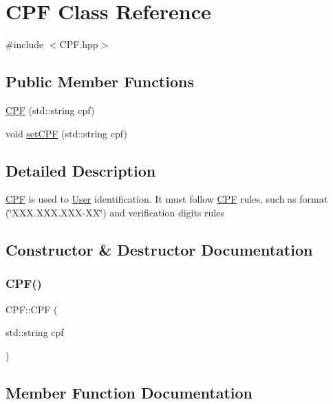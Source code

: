 \hypertarget{class_c_p_f}{}\section{C\+PF Class Reference}
\label{class_c_p_f}


{\ttfamily \#include $<$C\+P\+F.\+hpp$>$}

\subsection*{Public Member Functions}
\begin{DoxyCompactItemize}
\item 
\mbox{\hyperlink{class_c_p_f_ae6d429bd44c42bdbad7835b38bfe1639}{C\+PF}} (std\+::string cpf)
\item 
void \mbox{\hyperlink{class_c_p_f_a13881eec59b8edf78e9b99ab5cecd2e5}{set\+C\+PF}} (std\+::string cpf)
\end{DoxyCompactItemize}


\subsection{Detailed Description}
\mbox{\hyperlink{class_c_p_f}{C\+PF}} is used to \mbox{\hyperlink{class_user}{User}} identification. It must follow \mbox{\hyperlink{class_c_p_f}{C\+PF}} rules, such as format (\char`\"{}\+X\+X\+X.\+X\+X\+X.\+X\+X\+X-\/\+X\+X\char`\"{}) and verification digits rules 

\subsection{Constructor \& Destructor Documentation}
\mbox{\label{class_c_p_f_ae6d429bd44c42bdbad7835b38bfe1639}} 
\subsubsection{\texorpdfstring{CPF()}{CPF()}}
{\footnotesize\ttfamily C\+P\+F\+::\+C\+PF (\begin{DoxyParamCaption}\item[{std\+::string}]{cpf }\end{DoxyParamCaption})}



\subsection{Member Function Documentation}
\mbox{\label{class_c_p_f_a13881eec59b8edf78e9b99ab5cecd2e5}} 
